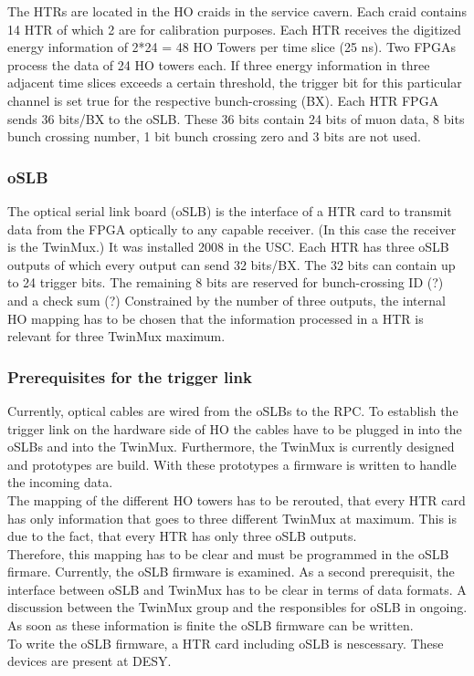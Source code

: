 The HTRs are located in the HO craids in the service cavern. Each craid contains 14 HTR of which 2 are for calibration purposes. Each HTR receives the digitized energy information of 2*24 = 48 HO Towers per time slice (25 ns). Two FPGAs process the data of 24 HO towers each.
If three energy information in three adjacent time slices exceeds a certain threshold, the trigger bit for this particular channel is set true for the respective bunch-crossing (BX).
Each HTR FPGA sends 36 bits/BX to the oSLB. These 36 bits contain 24 bits of muon data, 8 bits bunch crossing number, 1 bit bunch crossing zero and 3 bits are not used.
\subsubsection{oSLB}
The optical serial link board (oSLB) is the interface of a HTR card to transmit data from the FPGA optically to any capable receiver. (In this case the receiver is the TwinMux.) It was installed 2008 in the USC. Each HTR has three oSLB outputs of which every output can send 32 bits/BX. The 32 bits can contain up to 24 trigger bits. The remaining 8 bits are reserved for bunch-crossing ID (?) and a check sum (?) Constrained by the number of three outputs, the internal HO mapping has to be chosen that the information processed in a HTR is relevant for three TwinMux maximum.
\subsubsection{Prerequisites for the trigger link}
Currently, optical cables are wired from the oSLBs to the RPC. To establish the trigger link on the hardware side of HO the cables have to be plugged in into the oSLBs and into the TwinMux. Furthermore, the TwinMux is currently designed and prototypes are build. With these prototypes a firmware is written to handle the incoming data.\\
The mapping of the different HO towers has to be rerouted, that every HTR card has only information that goes to three different TwinMux at maximum. This is due to the fact, that every HTR has only three oSLB outputs.\\
Therefore, this mapping has to be clear and must be programmed in the oSLB firmare. Currently, the oSLB firmware is examined. As a second prerequisit, the interface between oSLB and TwinMux has to be clear in terms of data formats. A discussion between the TwinMux group and the responsibles for oSLB in ongoing. As soon as these information is finite the oSLB firmware can be written.\\
To write the oSLB firmware, a HTR card including oSLB is nescessary. These devices are present at DESY.